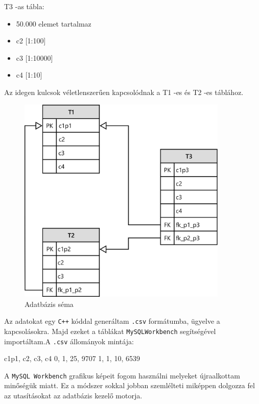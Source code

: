 T3 -as tábla:
\begin{itemize}   
\item 50.000 elemet tartalmaz
\item c2    [1:100]
\item c3    [1:10000]
\item c4    [1:10]
\end{itemize}
Az idegen kulcsok véletlenszerűen kapcsolódnak a T1 -es és T2 -es táblához.

\begin{figure}[h!]
\centering
\includegraphics[width=10cm]{images/new_schema.png}
\caption{Adatbázis séma}
\label{fig:schema}
\end{figure}




Az adatokat egy \texttt{C++} kóddal generáltam \texttt{.csv} formátumba, ügyelve a kapcsolásokra. Majd ezeket a táblákat \texttt{MySQLWorkbench} segítségével importáltam.A \texttt{.csv} állományok mintája:
\begin{python}
c1p1, c2, c3, c4
0, 1, 25, 9707
1, 1, 10, 6539
\end{python}
\newpage
{}

A \texttt{MySQL Workbench} grafikus képeit fogom használni melyeket újraalkottam minőségük miatt. Ez a módszer sokkal jobban szemlélteti miképpen dolgozza fel az utasításokat az adatbázis kezelő motorja.

